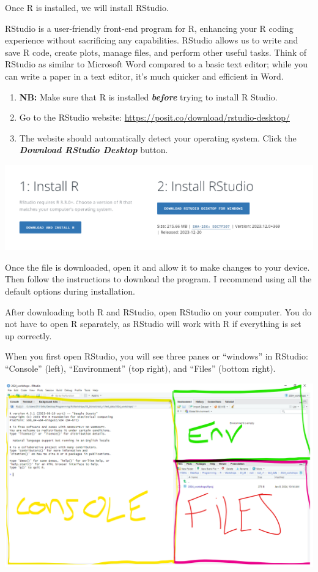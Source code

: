 \documentclass[
]{book}
\providecommand{\tightlist}{%
  \setlength{\itemsep}{0pt}\setlength{\parskip}{0pt}}
\begin{document}
Once R is installed, we will install RStudio.

RStudio is a user-friendly front-end program for R, enhancing your R coding experience without sacrificing any capabilities. RStudio allows us to write and save R code, create plots, manage files, and perform other useful tasks. Think of RStudio as similar to Microsoft Word compared to a basic text editor; while you can write a paper in a text editor, it's much quicker and efficient in Word.

\begin{enumerate}
\def\labelenumi{\arabic{enumi}.}
\tightlist
\item
  \textbf{NB:} Make sure that R is installed \textbf{\emph{before}} trying to install R Studio.
\item
  Go to the RStudio website: \url{https://posit.co/download/rstudio-desktop/}
\item
  The website should automatically detect your operating system. Click the \textbf{\emph{Download RStudio Desktop}} button.
\end{enumerate}

\includegraphics{img/01-rstudiodownload.png}

Once the file is downloaded, open it and allow it to make changes to your device. Then follow the instructions to download the program. I recommend using all the default options during installation.

After downloading both R and RStudio, open RStudio on your computer. You do not have to open R separately, as RStudio will work with R if everything is set up correctly.

When you first open RStudio, you will see three panes or ``windows'' in RStudio: ``Console'' (left), ``Environment'' (top right), and ``Files'' (bottom right).

\includegraphics{img/rstudio_first.png}
\end{document}
